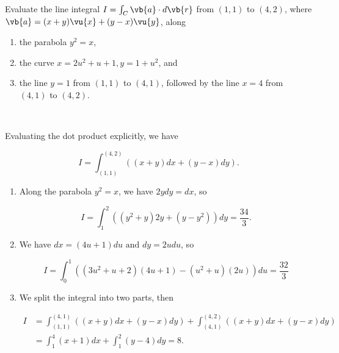 \documentclass[english,a4paper,12pt]{report}
\begin{document}
{Evaluate the line integral \(I = \int_{C}^{} \vb{a} \cdot d\vb{r}  \) from \((1,1)\) to \((4,2)\), where \(\vb{a}  = (x+y)\vu{x} + (y-x)\vu{y} \), along 
\begin{enumerate}
	\item the parabola \(y^2 = x\),
	\item the curve \(x = 2u^2+u+1, y= 1+u^2\), and
	\item the line \(y=1\) from \((1,1)\) to \((4,1)\), followed by the line \(x = 4\) from \((4,1)\) to \((4,2)\).      
\end{enumerate}
~
}
{Evaluating the dot product explicitly, we have 

\begin{equation}
	 I = \int_{(1,1)}^{(4,2)} ((x+y)dx + (y-x)dy).
\end{equation}

\begin{enumerate}
	\item Along the parabola \(y^2 = x\), we have \(2ydy = dx\), so 
	
	\begin{equation}
		I = \int_{1}^{2} ((y^2+y)2y + (y - y^2))dy = \frac{34}{3}.    
	\end{equation}
	
	\item We have \(dx = (4u+1)du \text { and } dy = 2udu\), so
	
	\begin{equation}
		I = \int_{0}^{1} ((3u^2+u+2)(4u+1)-(u^2+u)(2u))du = \frac{32}{3}  
	\end{equation}
	
	\item We split the integral into two parts, then 
	
	\begin{equation}
	\begin{aligned} 
		I &= \int_{(1,1)}^{(4,1)} ((x+y)dx + (y-x)dy) + \int_{(4,1)}^{(4,2)} ((x+y)dx + (y-x)dy) \\ &= \int_{1}^{4} (x+1)dx + \int_{1}^{2} (y-4)dy = 8.      
	\end{aligned} 
    \end{equation}
\end{enumerate}
~
} 
\end{document}
